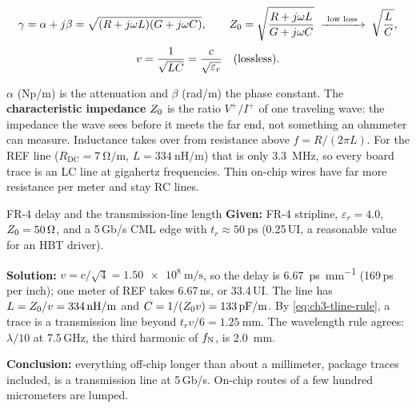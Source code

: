 \begin{keyeq}
\begin{equation}
  \begin{gathered}
  \gamma = \alpha + j\beta = \sqrt{(R + j\omega L)(G + j\omega C)}, \qquad
  \Zo = \sqrt{\frac{R + j\omega L}{G + j\omega C}} \;\xrightarrow{\ \text{low loss}\ }\; \sqrt{\frac{L}{C}},\\[2pt]
  v = \frac{1}{\sqrt{LC}} = \frac{c}{\sqrt{\varepsilon_r}} \quad\text{(lossless)}.
  \end{gathered}
  \label{eq:ch3-z0}
\end{equation}
\end{keyeq}
$\alpha$ (Np/m) is the attenuation and $\beta$ (rad/m) the phase constant. The \textbf{characteristic impedance} $Z_0$ is the ratio $V^+/I^+$ of one traveling wave: the impedance the wave sees before it meets the far end, not something an ohmmeter can measure. Inductance takes over from resistance above $f = R/(2\pi L)$. For the REF line ($R_\mathrm{DC} = \qty{7}{\ohm\per\meter}$, $L = \qty{334}{\nano\henry\per\meter}$) that is only \qty{3.3}{\mega\hertz}, so every board trace is an LC line at gigahertz frequencies. Thin on-chip wires have far more resistance per meter and stay RC lines.

\begin{example}{FR-4 delay and the transmission-line length}\label{we:ch3-delay}
\textbf{Given:} FR-4 stripline, $\varepsilon_r = 4.0$, $Z_0 = \qty{50}{\ohm}$, and a 5\,Gb/s CML edge with $t_r \approx \qty{50}{\pico\second}$ (0.25\,UI, a reasonable value for an \sgx{} HBT driver).

\textbf{Solution:} $v = c/\sqrt4 = \qty{1.50e8}{\meter\per\second}$, so the delay is \qty{6.67}{\pico\second\per\milli\meter} (169\,ps per inch); one meter of REF takes 6.67\,ns, or 33.4\,UI. The line has $L = \Zo/v = \qty{334}{\nano\henry\per\meter}$ and $C = 1/(\Zo v) = \qty{133}{\pico\farad\per\meter}$. By \cref{eq:ch3-tline-rule}, a trace is a transmission line beyond $t_r v/6 = \qty{1.25}{\milli\meter}$. The wavelength rule agrees: $\lambda/10$ at 7.5\,GHz, the third harmonic of $f_\mathrm{N}$, is \qty{2.0}{\milli\meter}.

\textbf{Conclusion:} everything off-chip longer than about a millimeter, package traces included, is a transmission line at 5\,Gb/s. On-chip routes of a few hundred micrometers are lumped.
\end{example}

